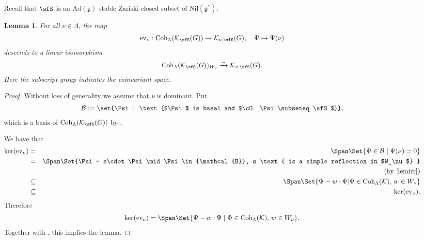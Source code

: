 \documentclass[12pt]{amsart}
\newcommand{\BS}{{\mathbb {S}}}
\newcommand{\CB}{{\mathcal {B}}}
\newcommand{\CK}{{\mathcal {K}}}
\newcommand{\CO}{{\mathcal {O}}}
\newcommand{\g}{\mathfrak g}
\numberwithin{equation}{section}
\newtheorem{lem}[thm]{Lemma}
\theoremstyle{remark}
\def\Coh{\mathrm{Coh}}
\def\ev#1{{\mathrm{ev}_{#1}}}
\def\Inn{\mathrm{Ad}}
\newcommand{\Grt}{\cK}
\begin{document}
Recall that $\sfS$ is an $\Inn(\g)$-stable Zariski closed subset of $\mathrm{Nil}(\g^*)$.

\begin{lem}\label{prop:ev00000}
  For all $\nu\in \Lambda$, the map
  \[
   \mathrm{ev}_\nu:  \Coh_{\Lambda}(\CK_\sfS(G))\rightarrow \CK_{\nu, \sfS}(G), \quad \Psi\mapsto \Psi(\nu)
  \]
  descends to a linear isomorphism
  \[
     \Coh_{\Lambda}(\CK_\sfS(G))_{W_{\nu}} \xrightarrow{\sim}\CK_{\nu, \sfS}(G).
  \]
  Here the subscript group indicates the coinvariant space. \end{lem}
\begin{proof}
  \def\BS{\cB_{\cS}} Without loss of generality we assume that $\nu$ is
  dominant. Put
  \[
    \CB:=\set{\Psi | \text{$\Psi$ is basal and $\cO_\Psi\subseteq \sfS$}},
  \]
  which is a basis of  $\Coh_{\Lambda}(\CK_\sfS(G))$ by . %

  We have that
  \begin{eqnarray*}
    \ker (\ev{\nu})& = & \Span \Set{\Psi\in \CB \mid
                                        \Psi(\nu)= 0 }\\ %
    &=& \Span \Set{\Psi - s\cdot\Psi \mid
                                        \Psi\in  \CB,
                                           s  \text{ is a simple reflection in $W_\nu$}
                                        } \\
                                        & &\quad (\textrm{by \Cref{lemirr}})\\
                          & \subseteq &\Span\Set{\Psi- w\cdot \Psi | \Psi\in  \Coh_{\Lambda}(\CK), \, w\in W_{\nu}} \\
                          &  \subseteq &  \ker (\ev{\nu}). %
  \end{eqnarray*}
Therefore
  \[
    \ker (\ev{\nu})=\Span\Set{\Psi- w \cdot\Psi \mid \Phi\in \Coh_{\Lambda}(\CK), \, w\in W_\nu}.
  \]
Together with , this implies the lemma.
\end{proof}
\end{document}
